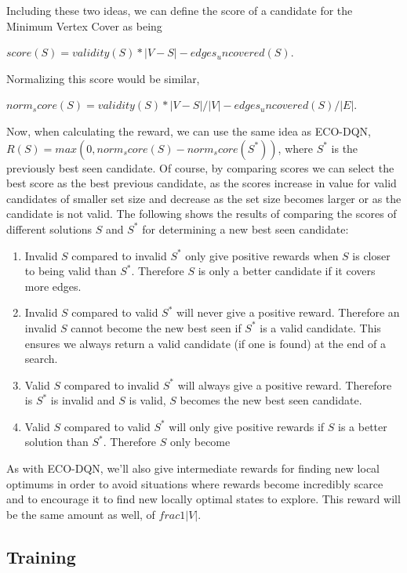 \documentclass{article}
\begin{document}
Including these two ideas, we can define the score of a candidate for the Minimum Vertex Cover as being 

$score(S) = validity(S) * |V - S| - edges_uncovered(S)$. 

Normalizing this score would be similar,

$norm_score(S) = validity(S) * |V - S| / |V| - edges_uncovered(S) / |E|$. 

Now, when calculating the reward, we can use the same idea as ECO-DQN, $R(S) = max(0, norm_score(S) - norm_score(S^*))$, where $S^*$ is the previously best seen candidate. Of course, by comparing scores we can select the best score as the best previous candidate, as the scores increase in value for valid candidates of smaller set size and decrease as the set size becomes larger or as the candidate is not valid. The following shows the results of comparing the scores of different solutions $S$ and $S^*$ for determining a new best seen candidate:

\begin{enumerate}
    \item Invalid $S$ compared to invalid $S^*$ only give positive rewards when $S$ is closer to being valid than $S^*$. Therefore $S$ is only a better candidate if it covers more edges.
    \item Invalid $S$ compared to valid $S^*$ will never give a positive reward. Therefore an invalid $S$ cannot become the new best seen if $S^*$ is a valid candidate. This ensures we always return a valid candidate (if one is found) at the end of a search.
    \item Valid $S$ compared to invalid $S^*$ will always give a positive reward. Therefore is $S^*$ is invalid and $S$ is valid, $S$ becomes the new best seen candidate.
    \item Valid $S$ compared to valid $S^*$ will only give positive rewards if $S$ is a better solution than $S^*$. Therefore $S$ only become
\end{enumerate}

As with ECO-DQN, we'll also give intermediate rewards for finding new local optimums in order to avoid situations where rewards become incredibly scarce and to encourage it to find new locally optimal states to explore. This reward will be the same amount as well, of $frac{1}{|V|}$.

\subsection{Training}
\end{document}
